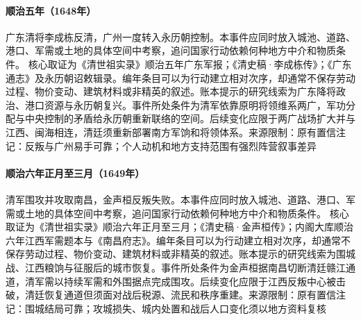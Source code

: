 \hypertarget{civic:EQ-1648-LI-CHENGDONG}{}\paragraph{顺治五年（1648年）}广东清将李成栋反清，广州一度转入永历朝控制。本事件应同时放入城池、道路、港口、军需或土地的具体空间中考察，追问国家行动依赖何种地方中介和物质条件。 核心取证为《清世祖实录》顺治五年广东军报；《清史稿·李成栋传》；《广东通志》及永历朝诏敕辑录。编年条目可以为行动建立相对次序，却通常不保存劳动过程、物价变动、建筑材料或非精英的叙述。账本提示的研究线索为广东降将政治、港口资源与永历朝复兴。事件所处条件为清军依靠原明将领维系两广，军功分配与中央控制的矛盾给永历朝重新联络的空间。后续变化应限于两广战场扩大并与江西、闽海相连，清廷须重新部署南方军饷和将领体系。来源限制：原有置信注记：反叛与广州易手可靠；个人动机和地方支持范围有强烈阵营叙事差异
\hypertarget{civic:EQ-1649-NANCHANG}{}\paragraph{顺治六年正月至三月（1649年）}清军围攻并攻取南昌，金声桓反叛失败。本事件应同时放入城池、道路、港口、军需或土地的具体空间中考察，追问国家行动依赖何种地方中介和物质条件。 核心取证为《清世祖实录》顺治六年正月至三月；《清史稿·金声桓传》；内阁大库顺治六年江西军需题本与《南昌府志》。编年条目可以为行动建立相对次序，却通常不保存劳动过程、物价变动、建筑材料或非精英的叙述。账本提示的研究线索为围城战、江西粮饷与征服后的城市恢复。事件所处条件为金声桓据南昌切断清廷赣江通道，清军需以持续军需和外围据点完成围攻。后续变化应限于江西反叛中心被击破，清廷恢复通道但须面对战后税源、流民和秩序重建。来源限制：原有置信注记：围城结局可靠；攻城损失、城内处置和战后人口变化须以地方资料复核

